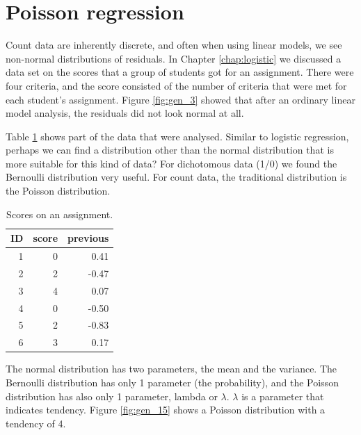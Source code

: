\documentclass[]{book}\usepackage[]{graphicx}\usepackage[]{color}
\begin{document}
\section{Poisson regression}


Count data are inherently discrete, and often when using linear models, we see non-normal distributions of residuals. In Chapter \ref{chap:logistic} we discussed a data set on the scores that a group of students got for an assignment. There were four criteria, and the score consisted of the number of criteria that were met for each student's assignment. Figure \ref{fig:gen_3} showed that after an ordinary linear model analysis, the residuals did not look normal at all.

Table \ref{tab:gen_14} shows part of the data that were analysed. Similar to logistic regression, perhaps we can find a distribution other than the normal distribution that is more suitable for this kind of data? For dichotomous data (1/0) we found the Bernoulli distribution very useful. For count data, the traditional distribution is the Poisson distribution.


\begin{table}[ht]
\centering
\caption{Scores on an assignment.} 
\label{tab:gen_14}
\begin{tabular}{rrr}
  \hline
ID & score & previous \\ 
  \hline
1 & 0 & 0.41 \\ 
  2 & 2 & -0.47 \\ 
  3 & 4 & 0.07 \\ 
  4 & 0 & -0.50 \\ 
  5 & 2 & -0.83 \\ 
  6 & 3 & 0.17 \\ 
   \hline
\end{tabular}
\end{table}


The normal distribution has two parameters, the mean and the variance. The Bernoulli distribution has only 1 parameter (the probability), and the Poisson distribution has also only 1 parameter, lambda or $\lambda$. $\lambda$ is a parameter that indicates tendency. Figure \ref{fig:gen_15} shows a Poisson distribution with a tendency of 4.
\end{document}
